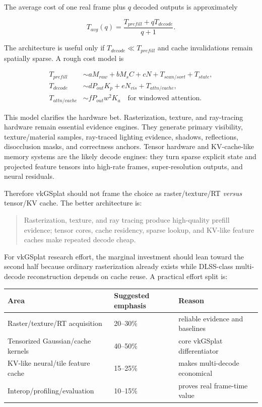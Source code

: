 \documentclass[11pt]{article}
\begin{document}
The average cost of one real frame plus $q$ decoded outputs is approximately

\[
  T_{avg}(q)=\frac{T_{prefill}+qT_{decode}}{q+1}.
\]

The architecture is useful only if $T_{decode}\ll T_{prefill}$ and cache
invalidations remain spatially sparse. A rough cost model is

\[
\begin{aligned}
  T_{prefill} &\sim aM_{raw}+bM_sC+cN+T_{scan/sort}+T_{state},\\
  T_{decode}  &\sim dP_{out}K_p+eN_{vis}+T_{attn/cache},\\
  T_{attn/cache} &\sim fP_{out}w^2K_a
        \quad\text{for windowed attention.}
\end{aligned}
\]

This model clarifies the hardware bet. Rasterization, texture, and ray-tracing
hardware remain essential evidence engines. They generate primary visibility,
texture/material samples, ray-traced lighting evidence, shadows, reflections,
disocclusion masks, and correctness anchors. Tensor hardware and KV-cache-like
memory systems are the likely decode engines: they turn sparse explicit state
and projected feature tensors into high-rate frames, super-resolution outputs,
and neural residuals.

Therefore vkGSplat should not frame the choice as raster/texture/RT
\emph{versus} tensor/KV cache. The better architecture is:

\begin{quote}
Rasterization, texture, and ray tracing produce high-quality prefill evidence;
tensor cores, cache residency, sparse lookup, and KV-like feature caches make
repeated decode cheap.
\end{quote}

For vkGSplat research effort, the marginal investment should lean toward the
second half because ordinary rasterization already exists while DLSS-class
multi-decode reconstruction depends on cache reuse. A practical effort split is:

\begin{center}
\begin{tabular}{lll}
\toprule
Area & Suggested emphasis & Reason \\
\midrule
Raster/texture/RT acquisition & 20--30\% & reliable evidence and baselines \\
Tensorized Gaussian/cache kernels & 40--50\% & core vkGSplat differentiator \\
KV-like neural/tile feature cache & 15--25\% & makes multi-decode economical \\
Interop/profiling/evaluation & 10--15\% & proves real frame-time value \\
\bottomrule
\end{tabular}
\end{center}
\end{document}
